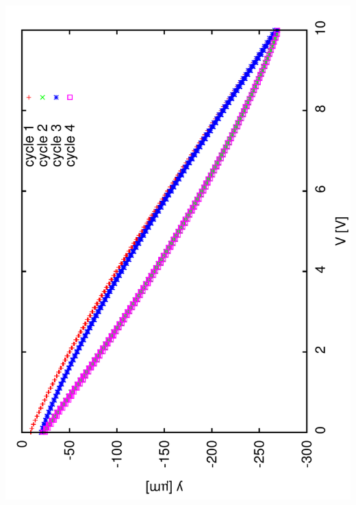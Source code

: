 \documentclass[a4paper,11pt]{book}
\begin{document}
\includegraphics[angle=-90,scale=0.15]{image12.pdf}
\end{document}
